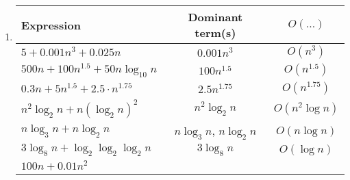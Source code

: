 \documentclass[]{article}
\begin{document}
\begin{enumerate}
\item 
\begin{tabular}{|l|c|c|} \hline
Expression & Dominant term(s) &  
\hspace*{1mm} $O(\ldots)$ \hspace*{1mm}  \\ \hline
\begin{minipage}{50mm} \vspace*{1mm}
$5 + 0.001 n^{3} + 0.025 n$ \vspace*{1mm}
\end{minipage}
& $0.001 n^{3}$ & $O(n^{3})$\\ \hline
\begin{minipage}{50mm} \vspace*{1mm}
$500 n + 100 n^{1.5} + 50 n\log_{10}n$ \vspace*{1mm}
\end{minipage}
& $100n^{1.5}$ &  $O(n^{1.5})$\\ \hline
\begin{minipage}{50mm} \vspace*{1mm}
$0.3n + 5 n^{1.5} + 2.5 \cdot n^{1.75}$ \vspace*{1mm}
\end{minipage}
& $2.5n^{1.75}$ & $O(n^{1.75})$\\ \hline
\begin{minipage}{50mm} \vspace*{1mm}
$n^{2} \log_{2}n + n (\log_{2} n )^{2}$ \vspace*{1mm}
\end{minipage}
& $n^{2} \log_{2} n$ & $O(n^{2} \log n)$ \\ \hline
\begin{minipage}{50mm} \vspace*{1mm}
$n \log_{3} n  + n \log_{2}n$ \vspace*{1mm}
\end{minipage}
& $n\log_{3}n$, $n\log_{2}n$ & $O(n\log n)$ \\ \hline
\begin{minipage}{50mm} \vspace*{1mm}
$3 \log_{8}n + \log_{2} \log_{2} \log_{2} n$ \vspace*{1mm}
\end{minipage}
& $3\log_{8}n$ & $O(\log n)$\\ \hline
\begin{minipage}{50mm} \vspace*{2mm}
$100n + 0.01n^{2}$ \vspace*{2mm}

\end{minipage}
\end{tabular}
\end{enumerate}
\end{document}
